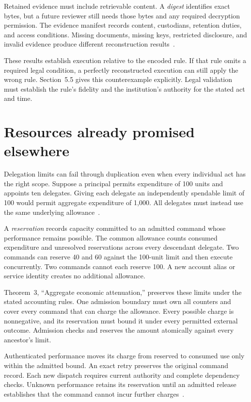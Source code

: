 \documentclass{momentum}
\begin{document}
Retained evidence must include retrievable content.
A \emph{digest} identifies exact bytes, but a future reviewer still needs those bytes and any required decryption permission.
The evidence manifest records content, custodians, retention duties, and access conditions.
Missing documents, missing keys, restricted disclosure, and invalid evidence produce different reconstruction results~\cite[Section~6.2]{institutions}.

These results establish execution relative to the encoded rule.
If that rule omits a required legal condition, a perfectly reconstructed execution can still apply the wrong rule.
Section~5.5 gives this counterexample explicitly.
Legal validation must establish the rule's fidelity and the institution's authority for the stated act and time.

\section{Resources already promised elsewhere}
\label{sec:resources}

Delegation limits can fail through duplication even when every individual act has the right scope.
Suppose a principal permits expenditure of 100 units and appoints ten delegates.
Giving each delegate an independently spendable limit of 100 would permit aggregate expenditure of 1,000.
All delegates must instead use the same underlying allowance~\cite[Section~7.5]{institutions}.

A \emph{reservation} records capacity committed to an admitted command whose performance remains possible.
The common allowance counts consumed expenditure and unresolved reservations across every descendant delegate.
Two commands can reserve 40 and 60 against the 100-unit limit and then execute concurrently.
Two commands cannot each reserve 100.
A new account alias or service identity creates no additional allowance.

Theorem~3, ``Aggregate economic attenuation,'' preserves these limits under the stated accounting rules.
One admission boundary must own all counters and cover every command that can charge the allowance.
Every possible charge is nonnegative, and its reservation must bound it under every permitted external outcome.
Admission checks and reserves the amount atomically against every ancestor's limit.

Authenticated performance moves its charge from reserved to consumed use only within the admitted bound.
An exact retry preserves the original command record.
Each new dispatch requires current authority and complete dependency checks.
Unknown performance retains its reservation until an admitted release establishes that the command cannot incur further charges~\cite[Section~7.5]{institutions}.
\end{document}
